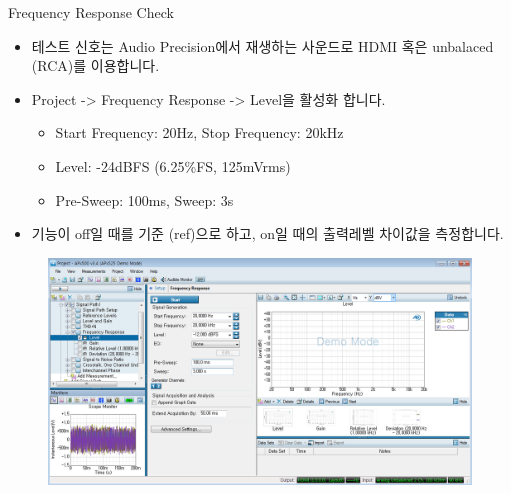 \documentclass{beamer}
\begin{document}
\begin{frame}[t]{Frequency Response Check}
\begin{itemize}
\item 테스트 신호는 Audio Precision에서 재생하는 사운드로 HDMI 혹은 unbalaced (RCA)를 이용합니다.
\item Project -> Frequency Response -> Level을 활성화 합니다.
	\begin{itemize}
	\item Start Frequency: 20Hz, Stop Frequency: 20kHz
	\item Level: -24dBFS (6.25\%FS, 125mVrms)
	\item Pre-Sweep: 100ms, Sweep: 3s
	\end{itemize}
\item 기능이 off일 때를 기준 (ref)으로 하고, on일 때의 출력레벨 차이값을 측정합니다.
\end{itemize}

\begin{figure}[r]
\includegraphics[height=0.4\textwidth]{figure/apsetting/frequencyResponse.png}
\end{figure}

\end{frame}
\end{document}
